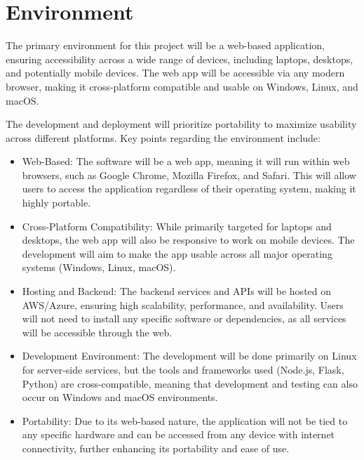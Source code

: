 \documentclass{article}
\begin{document}
\section{Environment}

The primary environment for this project will be a web-based application, ensuring accessibility across a wide range of devices, including laptops, desktops, and potentially mobile devices. The web app will be accessible via any modern browser, making it cross-platform compatible and usable on Windows, Linux, and macOS.

The development and deployment will prioritize portability to maximize usability across different platforms. Key points regarding the environment include:

\begin{itemize}
    \item Web-Based: The software will be a web app, meaning it will run within web browsers, such as Google Chrome, Mozilla Firefox, and Safari. This will allow users to access the application regardless of their operating system, making it highly portable.

    \item Cross-Platform Compatibility: While primarily targeted for laptops and desktops, the web app will also be responsive to work on mobile devices. The development will aim to make the app usable across all major operating systems (Windows, Linux, macOS).

    \item Hosting and Backend: The backend services and APIs will be hosted on AWS/Azure, ensuring high scalability, performance, and availability. Users will not need to install any specific software or dependencies, as all services will be accessible through the web.

    \item Development Environment: The development will be done primarily on Linux for server-side services, but the tools and frameworks used (Node.js, Flask, Python) are cross-compatible, meaning that development and testing can also occur on Windows and macOS environments.

    \item Portability: Due to its web-based nature, the application will not be tied to any specific hardware and can be accessed from any device with internet connectivity, further enhancing its portability and ease of use.
\end{itemize}
\end{document}

